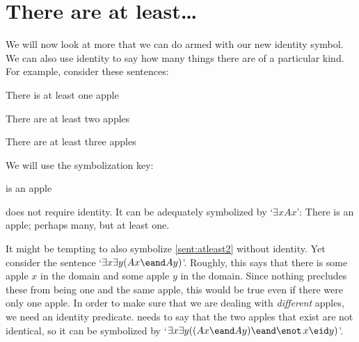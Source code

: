 





\section{There are at least\ldots}
We will now look at more that we can do armed with our new identity symbol.
We can also use identity to say how many things there are of a particular kind. For example, consider these sentences:
\begin{samplesent}
\item\label{sent:atleast1} There is at least one apple
\item\label{sent:atleast2} There are at least two apples
\item\label{sent:atleast3} There are at least three apples
\end{samplesent}
We will use the symbolization key:
	\begin{ekey}
		\item[Ax]  is an apple
	\end{ekey}
 does not require identity. It can be adequately symbolized by `$\exists x Ax$': There is an apple; perhaps many, but at least one.

It might be tempting to also symbolize \cref{sent:atleast2} without identity. Yet consider the sentence `$\exists x \exists y(Ax \eand Ay)$'. Roughly, this says that there is some apple $x$ in the domain and some apple $y$ in the domain. Since nothing precludes these from being one and the same apple, this would be true even if there were only one apple. In order to make sure that we are dealing with \emph{different} apples, we need an identity predicate.  needs to say that the two apples that exist are not identical, so it can be symbolized by `$\exists x \exists y((Ax \eand Ay) \eand \enot\, x\eid y)$'.

